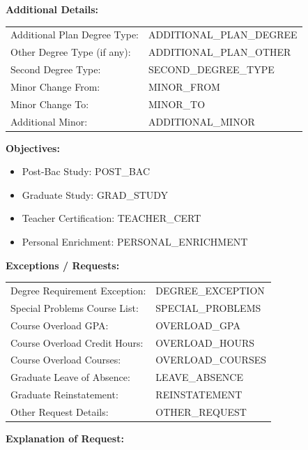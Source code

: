 \documentclass[12pt]{article}
\begin{document}
\vspace{0.5cm}

\textbf{Additional Details:}

\begin{tabular}{ll}
Additional Plan Degree Type: & ADDITIONAL_PLAN_DEGREE \\
Other Degree Type (if any): & ADDITIONAL_PLAN_OTHER \\
Second Degree Type: & SECOND_DEGREE_TYPE \\
Minor Change From: & MINOR_FROM \\
Minor Change To: & MINOR_TO \\
Additional Minor: & ADDITIONAL_MINOR \\
\end{tabular}

\vspace{0.5cm}

\textbf{Objectives:}

\begin{itemize}
  \item Post-Bac Study: POST_BAC
  \item Graduate Study: GRAD_STUDY
  \item Teacher Certification: TEACHER_CERT
  \item Personal Enrichment: PERSONAL_ENRICHMENT
\end{itemize}

\vspace{0.5cm}

\textbf{Exceptions / Requests:}

\begin{tabular}{ll}
Degree Requirement Exception: & DEGREE_EXCEPTION \\
Special Problems Course List: & SPECIAL_PROBLEMS \\
Course Overload GPA: & OVERLOAD_GPA \\
Course Overload Credit Hours: & OVERLOAD_HOURS \\
Course Overload Courses: & OVERLOAD_COURSES \\
Graduate Leave of Absence: & LEAVE_ABSENCE \\
Graduate Reinstatement: & REINSTATEMENT \\
Other Request Details: & OTHER_REQUEST \\
\end{tabular}

\vspace{0.5cm}

\textbf{Explanation of Request:}
\end{document}
